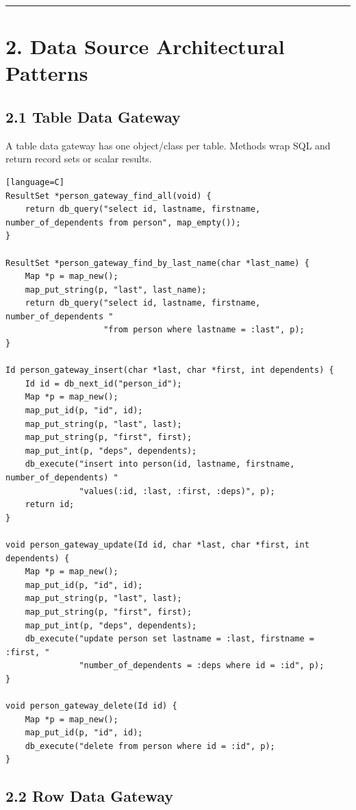 \documentclass[11pt]{article}
\begin{document}
\begin{center}\rule{0.5\linewidth}{0.5pt}\end{center}

\section{2. Data Source Architectural
Patterns}\label{data-source-architectural-patterns}

\subsection{2.1 Table Data Gateway}\label{table-data-gateway}

A table data gateway has one object/class per table. Methods wrap SQL
and return record sets or scalar results.

\begin{verbatim}[language=C]
ResultSet *person_gateway_find_all(void) {
    return db_query("select id, lastname, firstname, number_of_dependents from person", map_empty());
}

ResultSet *person_gateway_find_by_last_name(char *last_name) {
    Map *p = map_new();
    map_put_string(p, "last", last_name);
    return db_query("select id, lastname, firstname, number_of_dependents "
                    "from person where lastname = :last", p);
}

Id person_gateway_insert(char *last, char *first, int dependents) {
    Id id = db_next_id("person_id");
    Map *p = map_new();
    map_put_id(p, "id", id);
    map_put_string(p, "last", last);
    map_put_string(p, "first", first);
    map_put_int(p, "deps", dependents);
    db_execute("insert into person(id, lastname, firstname, number_of_dependents) "
               "values(:id, :last, :first, :deps)", p);
    return id;
}

void person_gateway_update(Id id, char *last, char *first, int dependents) {
    Map *p = map_new();
    map_put_id(p, "id", id);
    map_put_string(p, "last", last);
    map_put_string(p, "first", first);
    map_put_int(p, "deps", dependents);
    db_execute("update person set lastname = :last, firstname = :first, "
               "number_of_dependents = :deps where id = :id", p);
}

void person_gateway_delete(Id id) {
    Map *p = map_new();
    map_put_id(p, "id", id);
    db_execute("delete from person where id = :id", p);
}
\end{verbatim}

\subsection{2.2 Row Data Gateway}\label{row-data-gateway}
\end{document}
